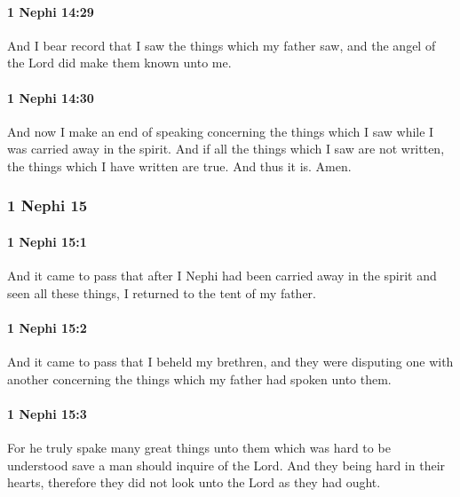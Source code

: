 		\paragraph{1 Nephi 14:29} %
			\label{1NEPHI-14-29}

			And I bear record that I saw the things which my father saw,
			and the angel of the Lord did make them known unto me.

		\paragraph{1 Nephi 14:30} %
			\label{1NEPHI-14-30}

			And now I make an end of speaking concerning the things
			which I saw while I was carried away in the spirit.
			And if all the things which I saw are not written,
			the things which I have written are true.
			And thus it is.
			Amen.

	\subsubsection{1 Nephi 15} %
		\label{1NEPHI-15}
		
		\paragraph{1 Nephi 15:1} %
			\label{1NEPHI-15-1}

			And it came to pass that
			after I Nephi had been carried away in the spirit and seen all these things,
			I returned to the tent of my father.

		\paragraph{1 Nephi 15:2} %
			\label{1NEPHI-15-2}

			And it came to pass that I beheld my brethren,
			and they were disputing one with another
			concerning the things which my father had spoken unto them.

		\paragraph{1 Nephi 15:3} %
			\label{1NEPHI-15-3}

			For he truly spake many great things unto them
			which was hard to be understood
			save a man should inquire of the Lord.
			And they being hard in their hearts,
			therefore they did not look unto the Lord as they had ought.

